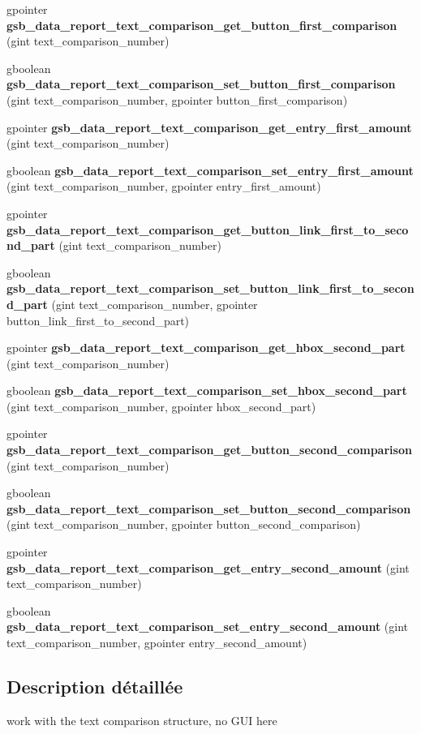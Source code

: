 \begin{DoxyCompactItemize}
gpointer {\bf gsb\_\-data\_\-report\_\-text\_\-comparison\_\-get\_\-button\_\-first\_\-comparison} (gint text\_\-comparison\_\-number)
\item 
gboolean {\bf gsb\_\-data\_\-report\_\-text\_\-comparison\_\-set\_\-button\_\-first\_\-comparison} (gint text\_\-comparison\_\-number, gpointer button\_\-first\_\-comparison)
\item 
gpointer {\bf gsb\_\-data\_\-report\_\-text\_\-comparison\_\-get\_\-entry\_\-first\_\-amount} (gint text\_\-comparison\_\-number)
\item 
gboolean {\bf gsb\_\-data\_\-report\_\-text\_\-comparison\_\-set\_\-entry\_\-first\_\-amount} (gint text\_\-comparison\_\-number, gpointer entry\_\-first\_\-amount)
\item 
gpointer {\bf gsb\_\-data\_\-report\_\-text\_\-comparison\_\-get\_\-button\_\-link\_\-first\_\-to\_\-second\_\-part} (gint text\_\-comparison\_\-number)
\item 
gboolean {\bf gsb\_\-data\_\-report\_\-text\_\-comparison\_\-set\_\-button\_\-link\_\-first\_\-to\_\-second\_\-part} (gint text\_\-comparison\_\-number, gpointer button\_\-link\_\-first\_\-to\_\-second\_\-part)
\item 
gpointer {\bf gsb\_\-data\_\-report\_\-text\_\-comparison\_\-get\_\-hbox\_\-second\_\-part} (gint text\_\-comparison\_\-number)
\item 
gboolean {\bf gsb\_\-data\_\-report\_\-text\_\-comparison\_\-set\_\-hbox\_\-second\_\-part} (gint text\_\-comparison\_\-number, gpointer hbox\_\-second\_\-part)
\item 
gpointer {\bf gsb\_\-data\_\-report\_\-text\_\-comparison\_\-get\_\-button\_\-second\_\-comparison} (gint text\_\-comparison\_\-number)
\item 
gboolean {\bf gsb\_\-data\_\-report\_\-text\_\-comparison\_\-set\_\-button\_\-second\_\-comparison} (gint text\_\-comparison\_\-number, gpointer button\_\-second\_\-comparison)
\item 
gpointer {\bf gsb\_\-data\_\-report\_\-text\_\-comparison\_\-get\_\-entry\_\-second\_\-amount} (gint text\_\-comparison\_\-number)
\item 
gboolean {\bf gsb\_\-data\_\-report\_\-text\_\-comparison\_\-set\_\-entry\_\-second\_\-amount} (gint text\_\-comparison\_\-number, gpointer entry\_\-second\_\-amount)
\end{DoxyCompactItemize}


\subsection{Description détaillée}
work with the text comparison structure, no GUI here 

